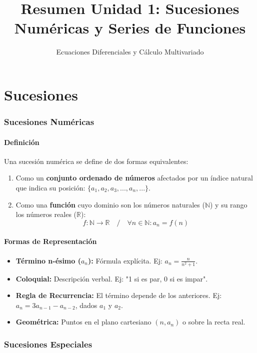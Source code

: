\documentclass[a4paper,12pt]{article}
\title{\textbf{Resumen Unidad 1: Sucesiones Numéricas y Series de Funciones}}
\author{Ecuaciones Diferenciales y Cálculo Multivariado}
\date{}
\begin{document}
\maketitle

\part{Sucesiones}

\section{Sucesiones Numéricas}

\subsection{Definición}
Una sucesión numérica se define de dos formas equivalentes:
\begin{enumerate}
    \item Como un \textbf{conjunto ordenado de números} afectados por un índice natural que indica su posición: $\{a_1, a_2, a_3, ..., a_n, ...\}$.
    \item Como una \textbf{función} cuyo dominio son los números naturales ($\mathbb{N}$) y su rango los números reales ($\mathbb{R}$):
    $$ f: \mathbb{N} \rightarrow \mathbb{R} \quad / \quad \forall n \in \mathbb{N}: a_n = f(n) $$
\end{enumerate}

\subsection{Formas de Representación}
\begin{itemize}
    \item \textbf{Término n-ésimo ($a_n$):} Fórmula explícita. Ej: $a_n = \frac{n}{n^2+1}$.
    \item \textbf{Coloquial:} Descripción verbal. Ej: "1 si es par, 0 si es impar".
    \item \textbf{Regla de Recurrencia:} El término depende de los anteriores. 
    Ej: $a_n = 3a_{n-1} - a_{n-2}$, dados $a_1$ y $a_2$.
    \item \textbf{Geométrica:} Puntos en el plano cartesiano $(n, a_n)$ o sobre la recta real.
\end{itemize}

\section{Sucesiones Especiales}
\end{document}
